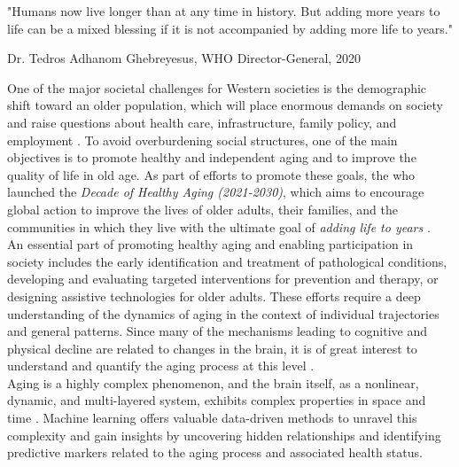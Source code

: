 \setlength{\epigraphwidth}{0.65\textwidth}
\epigraph{\centering "Humans now live longer than at any time in history. But adding more years to life can be a mixed blessing if it is not accompanied by adding more life to years."} {Dr. Tedros Adhanom Ghebreyesus, WHO Director-General, 2020}

\noindent One of the major societal challenges for Western societies is the demographic shift toward an older population, which will place enormous demands on society and raise questions about health care, infrastructure, family policy, and employment \cite{WHO_DECADE2020}. To avoid overburdening social structures, one of the main objectives is to promote healthy and independent aging and to improve the quality of life in old age. As part of efforts to promote these goals, the \gls{who} launched the \textit{Decade of Healthy Aging (2021-2030)}, which aims to encourage global action to improve the lives of older adults, their families, and the communities in which they live with the ultimate goal of \textit{adding life to years} \cite{WHO_DECADE2020}.\\
An essential part of promoting healthy aging and enabling participation in society includes the early identification and treatment of pathological conditions, developing and evaluating targeted interventions for prevention and therapy, or designing assistive technologies for older adults. These efforts require a deep understanding of the dynamics of aging in the context of individual trajectories and general patterns. Since many of the mechanisms leading to cognitive and physical decline are related to changes in the brain, it is of great interest to understand and quantify the aging process at this level \cite{Reuter-Lorenz2010}.\\
Aging is a highly complex phenomenon, and the brain itself, as a nonlinear, dynamic, and multi-layered system, exhibits complex properties in space and time \cite{Betzel2017}. Machine learning offers valuable data-driven methods to unravel this complexity and gain insights by uncovering hidden relationships and identifying predictive markers related to the aging process and associated health status.\\

